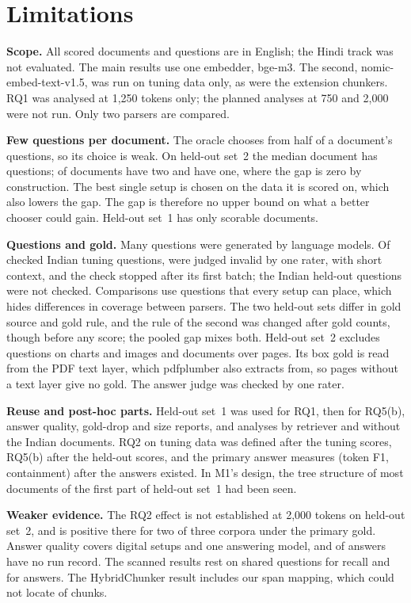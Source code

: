 \section{Limitations}\label{sec:limitations}

\textbf{Scope.} All scored documents and questions are in English; the Hindi track
was not evaluated. The main results use one embedder, bge-m3. The second,
nomic-embed-text-v1.5, was run on tuning data only, as were the extension
chunkers. RQ1 was analysed at 1,250 tokens only; the planned analyses at 750 and
2,000 were not run. Only two parsers are compared.

\textbf{Few questions per document.} The oracle chooses from half of a
document's questions, so its choice is weak. On held-out set~2 the median
document has \RQoneHTwoMedianQuestions{} questions;
\RQoneHTwoTwoQuestionDocuments{} of \RQoneHTwoDropRuleDocuments{} documents have
two and \RQoneHTwoOneQuestionDocuments{} have one, where the gap is zero by
construction. The best single setup is chosen on the data it is scored on, which
also lowers the gap. The gap is therefore no upper bound on what a better
chooser could gain. Held-out set~1 has only \RQoneDocuments{} scorable documents.

\textbf{Questions and gold.} Many questions were generated by language models. Of
\GoldenOverallLabelled{} checked Indian tuning questions, \GoldenOverallInvalid{}
were judged invalid by one rater, with short context, and the check stopped
after its first batch; the Indian held-out questions were not checked. Comparisons use questions that every setup can
place, which hides differences in coverage between parsers. The two held-out
sets differ in gold source and gold rule, and the rule of the second was changed
after gold counts, though before any score; the pooled gap mixes both. Held-out set~2
excludes questions on charts and images and documents over \HTwoMaxPages{} pages.
Its box
gold is read from the PDF text layer, which pdfplumber also extracts from, so
pages without a text layer give no gold. The answer judge was checked by one rater.

\textbf{Reuse and post-hoc parts.} Held-out set~1 was used for RQ1, then for
RQ5(b), answer quality, gold-drop and size reports, and analyses by retriever
and without the Indian documents. RQ2 on tuning data was defined after the
tuning scores, RQ5(b) after the held-out scores, and the primary answer measures
(token F1, containment) after the answers existed. In M1's design, the tree
structure of most documents of the first part of held-out set~1 had been seen.

\textbf{Weaker evidence.} The RQ2 effect is not established at 2,000 tokens on
held-out set~2, and is positive there for two of three corpora under the primary gold.
Answer quality covers \RQfourSetups{} digital setups and one answering model,
and \AQUnrecordedAnswers{} of \AQAnswers{} answers have no run record. The scanned
results rest on \RQfiveAScannedQuestions{} shared questions for recall and
\AQScannedQuestions{} for answers. The HybridChunker result includes our span
mapping, which could not locate \ExtHybridUnlocated{} of \ExtHybridChunks{} chunks.
